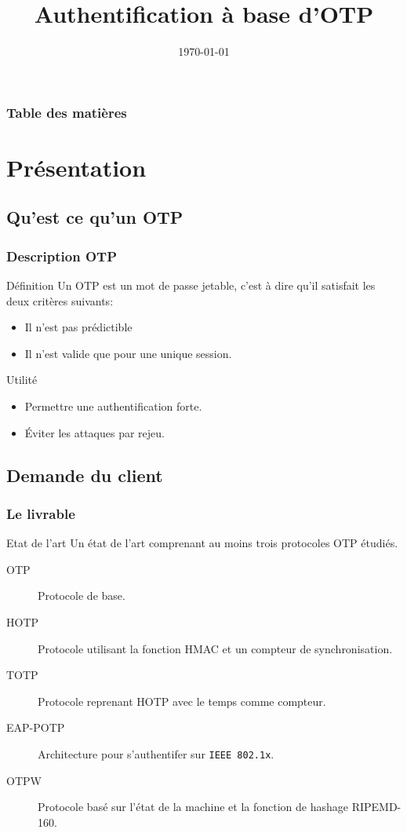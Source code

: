 \documentclass{beamer}
\title[M1SSI]{Authentification \`{a} base d'OTP}
\institute[Universit\'{e} de Rouen] {
Universit\'{e} de Rouen \\
\medskip
}
\date{\today}
\begin{document}
\begin{frame}
\titlepage
\end{frame}

\begin{frame}
\frametitle{Table des mati\`{e}res}
\tableofcontents
\end{frame}

\section{Pr\'{e}sentation}

\subsection{Qu'est ce qu'un OTP}

\begin{frame}
\frametitle{Description OTP}
\begin{block}{Définition}
    Un OTP est un mot de passe jetable, c'est à dire qu'il satisfait les deux 
  critères suivants:
  \begin{itemize}
    \item Il n'est pas prédictible
    \item Il n'est valide que pour une unique session.
  \end{itemize}
\end{block}

\begin{block}{Utilité}
  \begin{itemize}
    \item Permettre une authentification forte.
    \item Éviter les attaques par rejeu.
  \end{itemize}
\end{block}
\end{frame}

\subsection{Demande du client}

\begin{frame}
\frametitle{Le livrable}
\begin{block}{Etat de l'art} 
Un état de l'art comprenant au moins trois protocoles OTP étudiés.
\begin{description}
 \item[OTP] Protocole de base.
 \item[HOTP] Protocole utilisant la fonction HMAC et un compteur de 
  synchronisation.
 \item[TOTP] Protocole reprenant HOTP avec le temps comme compteur.
 \item[EAP-POTP] Architecture pour s'authentifer sur \verb?IEEE 802.1x?. 
 \item[OTPW] Protocole basé sur l'état de la machine et la fonction de hashage RIPEMD-160.
\end{description}
\end{block}
\end{frame}
\end{document}
